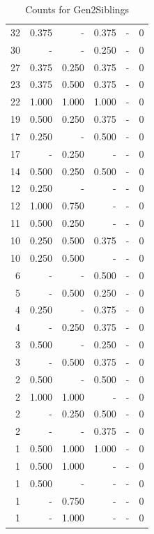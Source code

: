 \documentclass[a4paper]{article}\usepackage[]{graphicx}\usepackage[]{color}
\begin{document}
\begin{table}[ht]
\begin{tabular}{rrrrrr}
   \rowcolor{sosoColor} 32 & 0.375 & - & 0.375 & - & 0 \\ 
   \rowcolor{sosoColor} 30 & - & - & 0.250 & - & 0 \\ 
  27 & 0.375 & 0.250 & 0.375 & - & 0 \\ 
  23 & 0.375 & 0.500 & 0.375 & - & 0 \\ 
   \rowcolor{goodColor} 22 & 1.000 & 1.000 & 1.000 & - & 0 \\ 
  19 & 0.500 & 0.250 & 0.375 & - & 0 \\ 
   \rowcolor{sosoColor} 17 & 0.250 & - & 0.500 & - & 0 \\ 
  17 & - & 0.250 & - & - & 0 \\ 
   \rowcolor{badColor} 14 & 0.500 & 0.250 & 0.500 & - & 0 \\ 
   \rowcolor{nullColor} 12 & 0.250 & - & - & - & 0 \\ 
  12 & 1.000 & 0.750 & - & - & 0 \\ 
  11 & 0.500 & 0.250 & - & - & 0 \\ 
  10 & 0.250 & 0.500 & 0.375 & - & 0 \\ 
  10 & 0.250 & 0.500 & - & - & 0 \\ 
   \rowcolor{sosoColor} 6 & - & - & 0.500 & - & 0 \\ 
   \rowcolor{badColor} 5 & - & 0.500 & 0.250 & - & 0 \\ 
   \rowcolor{sosoColor} 4 & 0.250 & - & 0.375 & - & 0 \\ 
  4 & - & 0.250 & 0.375 & - & 0 \\ 
   \rowcolor{sosoColor} 3 & 0.500 & - & 0.250 & - & 0 \\ 
  3 & - & 0.500 & 0.375 & - & 0 \\ 
   \rowcolor{sosoColor} 2 & 0.500 & - & 0.500 & - & 0 \\ 
  2 & 1.000 & 1.000 & - & - & 0 \\ 
   \rowcolor{badColor} 2 & - & 0.250 & 0.500 & - & 0 \\ 
   \rowcolor{sosoColor} 2 & - & - & 0.375 & - & 0 \\ 
   \rowcolor{goodColor} 1 & 0.500 & 1.000 & 1.000 & - & 0 \\ 
  1 & 0.500 & 1.000 & - & - & 0 \\ 
   \rowcolor{nullColor} 1 & 0.500 & - & - & - & 0 \\ 
  1 & - & 0.750 & - & - & 0 \\ 
  1 & - & 1.000 & - & - & 0 \\ 
   \hline
\end{tabular}
\caption{Counts for Gen2Siblings} 
\end{table}
\end{document}
